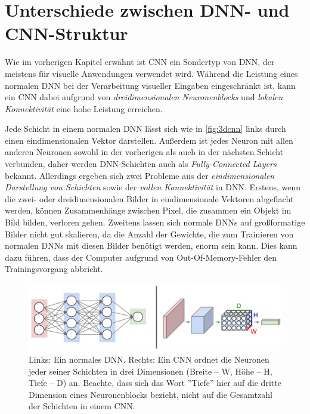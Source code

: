 \section{Unterschiede zwischen DNN- und CNN-Struktur}

Wie im vorherigen Kapitel erwähnt ist CNN ein Sondertyp von DNN, der meistens für visuelle Anwendungen verwendet wird. Während die Leistung eines normalen DNN bei der Verarbeitung visueller Eingaben eingeschränkt ist, kann ein CNN dabei aufgrund von \emph{dreidimensionalen Neuronenblocks} und \emph{lokalen Konnektivität} eine hohe Leistung erreichen. 

Jede Schicht in einem normalen DNN lässt sich wie in \autoref{fig:3dcnn} links durch einen eindimensionalen Vektor darstellen. Außerdem ist jedes Neuron mit allen anderen Neuronen sowohl in der vorherigen als auch in der nächsten Schicht verbunden, daher werden DNN-Schichten auch als \emph{Fully-Connected Layers} bekannt. Allerdings ergeben sich zwei Probleme aus der \emph{eindimensionalen Darstellung von Schichten} sowie der \emph{vollen Konnektivität} in DNN. Erstens, wenn die zwei- oder dreidimensionalen Bilder in eindimensionale Vektoren abgeflacht werden, können Zusammenhänge zwischen Pixel, die zusammen ein Objekt im Bild bilden, verloren gehen. Zweitens lassen sich normale DNNs auf großformatige Bilder nicht gut skalieren, da die Anzahl der Gewichte, die zum Trainieren von normalen DNNs mit diesen Bilder benötigt werden, enorm sein kann. Dies kann dazu führen, dass der Computer aufgrund von Out-Of-Memory-Fehler den Trainingsvorgang abbricht.

\begin{figure}[!hb]
	\centering
	\includegraphics[width=\linewidth]{images/3DCNN}
	\caption{Links: Ein normales DNN. Rechts: Ein CNN ordnet die Neuronen jeder seiner Schichten in drei Dimensionen (Breite – W, Höhe – H, Tiefe – D) an. Beachte, dass sich das Wort ''Tiefe'' hier auf die dritte Dimension eines Neuronenblocks bezieht, nicht auf die Gesamtzahl der Schichten in einem CNN.  \protect\cite{CS231nCNNarchitecture}}
	\label{fig:3dcnn}
\end{figure}

